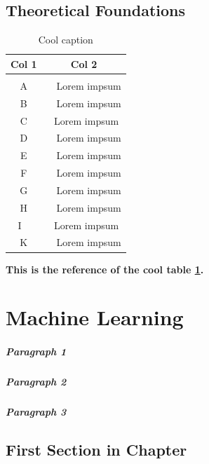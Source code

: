 \documentclass[12pt,twoside,a4paper,parskip]{scrbook} %
\begin{document}
\section{Theoretical Foundations}
\lipsum[1]
\vspace{1cm} %
\begin{table}[H]
	\begin{center}
		\begin{tabular}{c|c} 
			\textbf{Col 1} & \textbf{Col 2}
	\\
			\hline \\
			A	&  Lorem impsum
	\\ 
			B	&  Lorem impsum
	\\ 
			C	& Lorem impsum
	\\ 
			D	&  Lorem impsum
	\\ 
			E	&  Lorem impsum
	\\ 
			F	&  Lorem impsum
	\\ 
			G	&  Lorem impsum
	\\ 
			H	&  Lorem impsum
	\\ 
			I	 & Lorem impsum
	\\ 
			K	&  Lorem impsum
		\end{tabular}
	\end{center}
	\caption{Cool caption}
	\label{fig:cool_figure}
	\end{table}

\textbf{This is the reference of the cool table \ref{fig:cool_figure}.}\newline 

\lipsum[1-2]
\chapter{Machine Learning}
\lipsum[1-2]

\paragraph{Paragraph 1} \lipsum[2]

\paragraph{Paragraph 2} \lipsum[2]

\paragraph{Paragraph 3} \lipsum[2]
\lipsum[]

\section{First Section in Chapter}
\lipsum[1]
\end{document}
